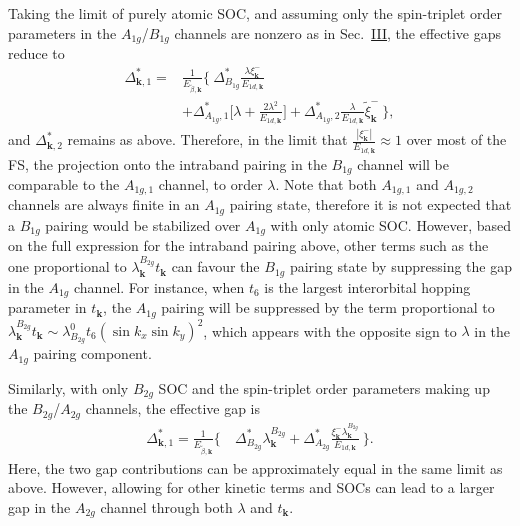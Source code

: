 \documentclass[%
reprint,
superscriptaddress,
 amsmath,amssymb,
 aps,
prb,
nobalancelastpage,
]{revtex4-2}
\begin{document}

Taking the limit of purely atomic SOC, and assuming only the spin-triplet order parameters in the $A_{1g}$/$B_{1g}$ channels are nonzero as in Sec.~\hyperref[Three]{III}, the effective gaps reduce to
\begin{equation}
\begin{aligned}
    \Delta_{\textbf{k},1}^{*} = &\frac{1}{E_{\widetilde{\beta},\textbf{k}}}\Big\{~\Delta_{B_{1g}}^{*}\frac{\lambda\xi_{\textbf{k}}^{-}}{E_{1d,\textbf{k}}} \\[6pt]&+ \Delta_{A_{1g},1}^{*}\bigl[\lambda + \frac{2\lambda^2}{E_{1d,\textbf{k}}}\bigr] + \Delta_{A_{1g},2}^{*}\frac{\lambda}{E_{1d,\textbf{k}}} \widetilde{\xi}_{\textbf{k}}^{-}~\Big\},
\end{aligned}
\end{equation}
and $\Delta_{\textbf{k},2}^{*}$ remains as above. Therefore, in the limit that $\frac{|\xi_{\textbf{k}}^{-}|}{E_{1d,\textbf{k}}}\approx 1$ over most of the FS, the projection onto the intraband pairing in the $B_{1g}$ channel will be comparable to the $A_{1g,1}$ channel, to order $\lambda$. Note that both $A_{1g,1}$ and $A_{1g,2}$ channels are always finite in an $A_{1g}$ pairing state, therefore it is not expected that a $B_{1g}$ pairing would be stabilized over $A_{1g}$ with only atomic SOC. However, based on the full expression for the intraband pairing above, other terms such as the one proportional to $\lambda_{\textbf{k}}^{B_{2g}}t_{\textbf{k}}$ can favour the $B_{1g}$ pairing state by suppressing the gap in the $A_{1g}$ channel. For instance, when $t_{6}$ is the largest interorbital hopping parameter in $t_{\textbf{k}}$, the $A_{1g}$ pairing will be suppressed by the term proportional to $\lambda_{\textbf{k}}^{B_{2g}}t_{\textbf{k}} \sim \lambda_{B_{2g}}^{0}t_{6}(\sin{k_x}\sin{k_y})^2$, which appears with the opposite sign to $\lambda$ in the $A_{1g}$ pairing component.

Similarly, with only $B_{2g}$ SOC and the spin-triplet order parameters making up the $B_{2g}$/$A_{2g}$ channels, the effective gap is
\begin{equation}
\begin{aligned}
    \Delta_{\textbf{k},1}^{*} = \frac{1}{E_{\widetilde{\beta},\textbf{k}}}\Big\{~&\Delta_{B_{2g}}^{*}\lambda_{\textbf{k}}^{B_{2g}} + \Delta_{A_{2g}}^{*}\frac{\xi_{\textbf{k}}^{-}\lambda_{\textbf{k}}^{B_{2g}}}{E_{1d,\textbf{k}}}~\Big\}.
\end{aligned}
\end{equation}
Here, the two gap contributions can be approximately equal in the same limit as above. However, allowing for other kinetic terms and SOCs can lead to a larger gap in the $A_{2g}$ channel through both $\lambda$ and $t_{\textbf{k}}$.
\end{document}
